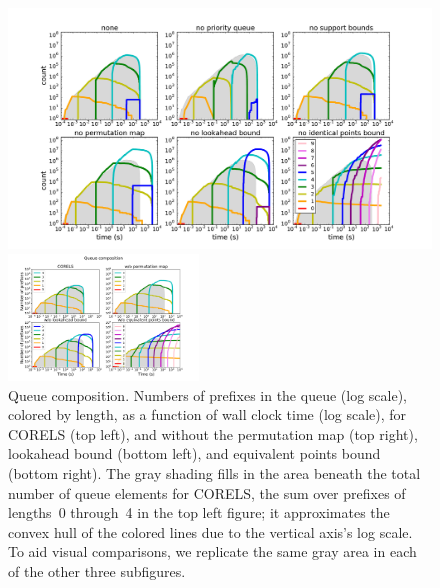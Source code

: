 \begin{figure}[t!]
\begin{center}
\begin{arxiv}
\includegraphics[width=\textwidth]{figs/ela_compas_compare-queue.pdf}
\end{arxiv}
\begin{kdd}
\includegraphics[trim={30mm 15mm 35mm 25mm}, width=0.45\textwidth]{figs/kdd_compas_compare_small-queue.pdf}
\end{kdd}
\end{center}
\caption{Queue composition. %
%
Numbers of prefixes in the queue (log scale), colored by length,
as a function of wall clock time (log scale),
for CORELS (top left), and without the permutation map (top right),
lookahead bound (bottom left), and equivalent points bound (bottom right).
%
The gray shading fills in the area beneath the total number of
queue elements for CORELS, \ie the sum over prefixes of lengths~0
through~4 in the top left figure; it approximates
the convex hull of the colored lines due to the vertical axis's log scale.
%
To aid visual comparisons, we replicate the same gray area
in each of the other three subfigures.
}
\label{fig:queue}
\end{figure}

